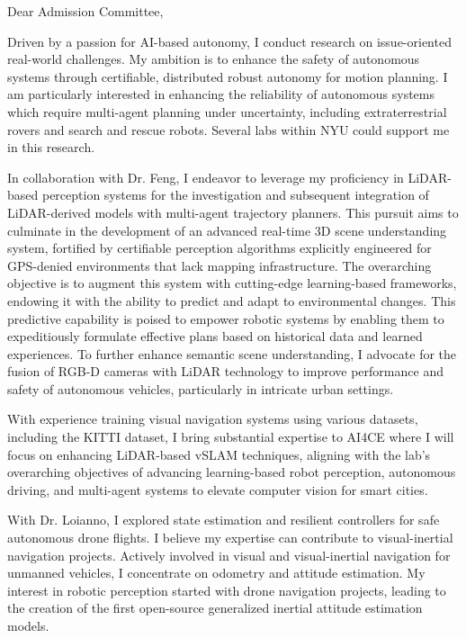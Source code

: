 \documentclass[12pt]{article}
\begin{document}
Dear Admission Committee, 

Driven by a passion for AI-based autonomy, I conduct research on issue-oriented real-world challenges. My ambition is to enhance the safety of autonomous systems through certifiable, distributed robust autonomy for motion planning. I am particularly interested in enhancing the reliability of autonomous systems which require multi-agent planning under uncertainty, including extraterrestrial rovers and search and rescue robots. Several labs within NYU could support me in this research.
 
In collaboration with Dr. Feng, I endeavor to leverage my proficiency in LiDAR-based perception systems for the investigation and subsequent integration of LiDAR-derived models with multi-agent trajectory planners. This pursuit aims to culminate in the development of an advanced real-time 3D scene understanding system, fortified by certifiable perception algorithms explicitly engineered for GPS-denied environments that lack mapping infrastructure. The overarching objective is to augment this system with cutting-edge learning-based frameworks, endowing it with the ability to predict and adapt to environmental changes. This predictive capability is poised to empower robotic systems by enabling them to expeditiously formulate effective plans based on historical data and learned experiences. To further enhance semantic scene understanding, I advocate for the fusion of RGB-D cameras with LiDAR technology to improve performance and safety of autonomous vehicles, particularly in intricate urban settings.

With experience training visual navigation systems using various datasets, including the KITTI dataset, I bring substantial expertise to AI4CE where I will focus on enhancing LiDAR-based vSLAM techniques, aligning with the lab's overarching objectives of advancing learning-based robot perception, autonomous driving, and multi-agent systems to elevate computer vision for smart cities.


With Dr. Loianno, I explored state estimation and resilient controllers for safe autonomous drone flights. I believe my expertise can contribute to visual-inertial navigation projects. Actively involved in visual and visual-inertial navigation for unmanned vehicles, I concentrate on odometry and attitude estimation. My interest in robotic perception started with drone navigation projects, leading to the creation of the first open-source generalized inertial attitude estimation models.
\end{document}
